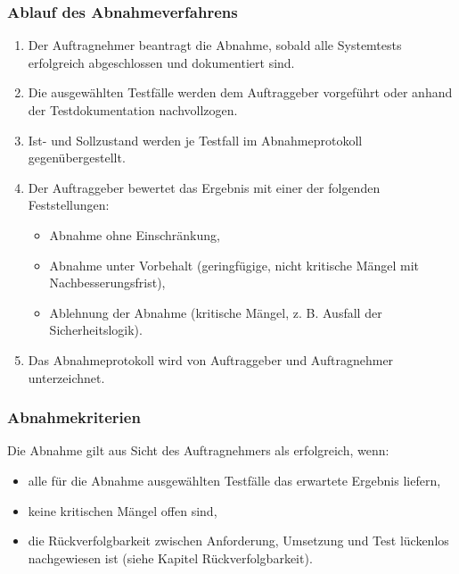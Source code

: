 \subsubsection{Ablauf des
Abnahmeverfahrens}\label{ablauf-des-abnahmeverfahrens}

\begin{enumerate}
\def\labelenumi{\arabic{enumi}.}
\tightlist
\item
  Der Auftragnehmer beantragt die Abnahme, sobald alle Systemtests
  erfolgreich abgeschlossen und dokumentiert sind.
\item
  Die ausgewählten Testfälle werden dem Auftraggeber vorgeführt oder
  anhand der Testdokumentation nachvollzogen.
\item
  Ist- und Sollzustand werden je Testfall im Abnahmeprotokoll
  gegenübergestellt.
\item
  Der Auftraggeber bewertet das Ergebnis mit einer der folgenden
  Feststellungen:

  \begin{itemize}
  \tightlist
  \item
    Abnahme ohne Einschränkung,
  \item
    Abnahme unter Vorbehalt (geringfügige, nicht kritische Mängel mit
    Nachbesserungsfrist),
  \item
    Ablehnung der Abnahme (kritische Mängel, z. B. Ausfall der
    Sicherheitslogik).
  \end{itemize}
\item
  Das Abnahmeprotokoll wird von Auftraggeber und Auftragnehmer
  unterzeichnet.
\end{enumerate}

\subsubsection{Abnahmekriterien}\label{abnahmekriterien}

Die Abnahme gilt aus Sicht des Auftragnehmers als erfolgreich, wenn:

\begin{itemize}
\tightlist
\item
  alle für die Abnahme ausgewählten Testfälle das erwartete Ergebnis
  liefern,
\item
  keine kritischen Mängel offen sind,
\item
  die Rückverfolgbarkeit zwischen Anforderung, Umsetzung und Test
  lückenlos nachgewiesen ist (siehe Kapitel Rückverfolgbarkeit).
\end{itemize}

